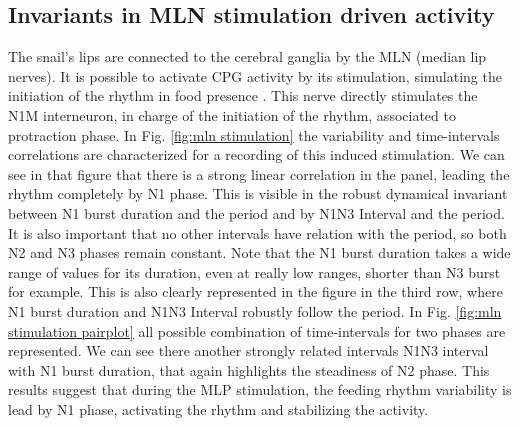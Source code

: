 \subsection{Invariants in MLN stimulation driven activity}
The snail's lips are connected to the cerebral ganglia by the MLN (median lip nerves). It is possible to activate CPG activity by its stimulation, simulating the initiation of the rhythm in food presence \parencite{staras_electrophysiological_1999}. This nerve directly stimulates the N1M interneuron, in charge of the initiation of the rhythm, associated to protraction phase. In Fig. \ref{fig:mln stimulation} the variability and time-intervals correlations are characterized for a recording of this induced stimulation. We can see in that figure that there is a strong linear correlation in the panel, leading the rhythm completely by N1 phase. This is visible in the robust dynamical invariant between N1 burst duration and the period and by N1N3 Interval and the period. It is also important that no other intervals have relation with the period, so both N2 and N3 phases remain constant. Note that the N1 burst duration takes a wide range of values for its duration, even at really low ranges, shorter than N3 burst for example. This is also clearly represented in the figure in the third row, where N1 burst duration and N1N3 Interval robustly follow the period. 
In Fig. \ref{fig:mln stimulation pairplot} all possible combination of time-intervals for two phases are represented. We can see there another strongly related intervals N1N3 interval with N1 burst duration, that again highlights the steadiness of N2 phase. 
This results suggest that during the MLP stimulation, the feeding rhythm variability is lead by N1 phase, activating the rhythm and stabilizing the activity. 


